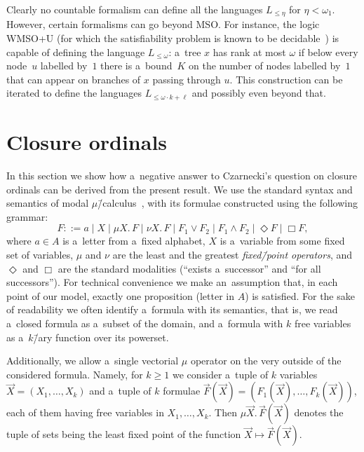 \documentclass{lmcs}
\numberwithin{equation}{section}
\numberwithin{figure}{section}
\begin{document}
\begin{rem}\label{rem:wmsou}
	Clearly no countable formalism can define all the languages $L_{\leq\eta}$ for $\eta<\omega_1$.
	However, certain formalisms can go beyond MSO.
	For instance, the logic WMSO+U (for which the satisfiability problem is known to be decidable~\cite{bojanczyk_wmso_u_p}) is capable of defining the language $L_{\leq \omega}$:
	a~tree $x$ has rank at most $\omega$ if below every node~$u$ labelled by~$1$ there is a~bound~$K$ on the number of nodes labelled by~$1$ that can appear on branches of $x$ passing through $u$.
	This construction can be iterated to define the languages $L_{\leq \omega\cdot k+\ell}$ and possibly even beyond that.
\end{rem}



\section{Closure ordinals}
\label{sec:closure_ordinals}

In this section we show how a~negative answer to Czarnecki's question on closure ordinals can be derived from the present result.
We use the standard syntax and semantics of modal $\mu$\=/calculus~\cite{kozen-mu-calc,niwinski_rudiments,Demri2016,julian-igor-handook}, with its formulae constructed using the following grammar:
\[F ::= a \mid X \mid \mu X.\, F \mid \nu X.\, F \mid F_1\lor F_2 \mid F_1\land F_2 \mid \Diamond F \mid \Box F,\]
where $a\in A$ is a~letter from a~fixed alphabet, $X$ is a~variable from some fixed set of variables,
$\mu$ and $\nu$ are the least and the greatest \emph{fixed\=/point operators}, and $\Diamond$ and $\Box$ are the standard modalities (``exists a~successor'' and ``for all successors'').
For technical convenience we make an~assumption that, in each point of our model, exactly one proposition (letter in $A$) is satisfied.
For the sake of readability we often identify a~formula with its semantics, that is, we read a~closed formula as a~subset of the domain,
and a~formula with $k$ free variables as a~$k$\=/ary function over its powerset.

Additionally, we allow a~single vectorial $\mu$ operator on the very outside of the considered formula.
Namely, for $k\geq 1$ we consider a~tuple of $k$ variables $\vec{X}=(X_1,\dots,X_k)$ and a~tuple of $k$ formulae $\vec{F}(\vec{X})=(F_1(\vec{X}),\dots,F_k(\vec{X}))$,
each of them having free variables in $X_1,\dots,X_k$.
Then $\mu\vec{X}.\,\vec{F}(\vec{X})$ denotes the tuple of sets being the least fixed point of the function $\vec{X}\mapsto\vec{F}(\vec{X})$.
\end{document}
